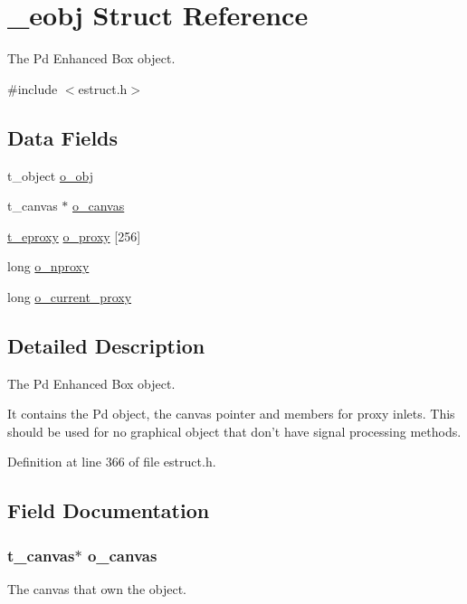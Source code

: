 \hypertarget{struct__eobj}{\section{\-\_\-eobj Struct Reference}
\label{struct__eobj}
}


The Pd Enhanced Box object.  




{\ttfamily \#include $<$estruct.\-h$>$}

\subsection*{Data Fields}
\begin{DoxyCompactItemize}
\item 
t\-\_\-object \hyperlink{struct__eobj_a8cffa8f3338cca7779ab922dab19227c}{o\-\_\-obj}
\item 
t\-\_\-canvas $\ast$ \hyperlink{struct__eobj_a4ac1a6544ba0591b83cbf38bc1349e74}{o\-\_\-canvas}
\item 
\hyperlink{struct__eproxy}{t\-\_\-eproxy} \hyperlink{struct__eobj_a9435dcf0a1aed105a4c38d24dfc65dbf}{o\-\_\-proxy} \mbox{[}256\mbox{]}
\item 
long \hyperlink{struct__eobj_a5959b8f1e0726d2a7d82a4d39ae803bb}{o\-\_\-nproxy}
\item 
long \hyperlink{struct__eobj_a32a8921c66d63fcccc9df035f6b9160f}{o\-\_\-current\-\_\-proxy}
\end{DoxyCompactItemize}


\subsection{Detailed Description}
The Pd Enhanced Box object. 

It contains the Pd object, the canvas pointer and members for proxy inlets. This should be used for no graphical object that don't have signal processing methods. 

Definition at line 366 of file estruct.\-h.



\subsection{Field Documentation}
\hypertarget{struct__eobj_a4ac1a6544ba0591b83cbf38bc1349e74}{
\subsubsection[{o\-\_\-canvas}]{\setlength{\rightskip}{0pt plus 5cm}t\-\_\-canvas$\ast$ o\-\_\-canvas}}\label{struct__eobj_a4ac1a6544ba0591b83cbf38bc1349e74}
The canvas that own the object. 

